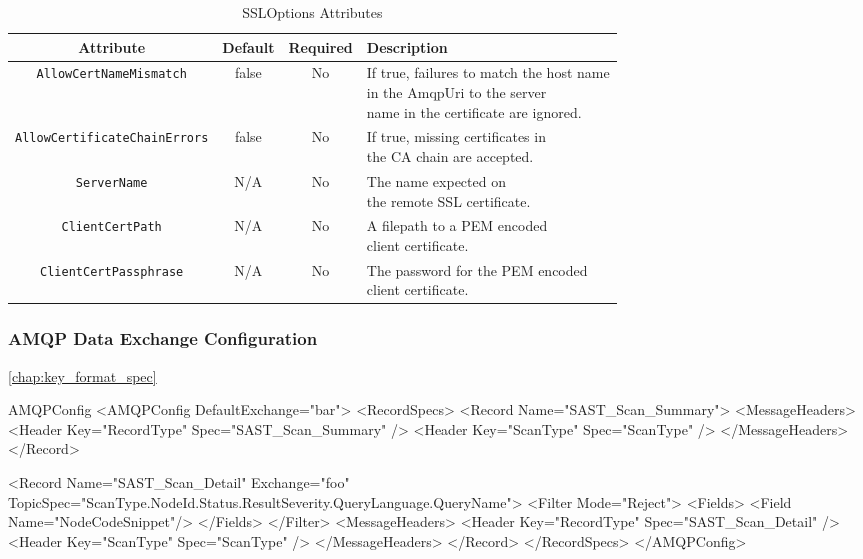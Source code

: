 \begin{table}[h]
    \caption{SSLOptions Attributes}        
    \begin{tabularx}{\textwidth}{cccl}
        \toprule
        \textbf{Attribute} & \textbf{Default} & \textbf{Required} & \textbf{Description}\\
        \midrule
        \texttt{AllowCertNameMismatch} & false & No & \makecell[l]{If true, failures to match the host name\\
        in the AmqpUri to the server\\
        name in the certificate are ignored.}\\
        \midrule
        \texttt{AllowCertificateChainErrors} & false & No & \makecell[l]{If true, missing certificates in\\
        the CA chain are accepted.}\\
        \midrule
        \texttt{ServerName} & N/A & No & \makecell[l]{The name expected on\\
        the remote SSL certificate.}\\
        \midrule
        \texttt{ClientCertPath} & N/A & No & \makecell[l]{A filepath to a PEM encoded\\
        client certificate.}\\
        \midrule
        \texttt{ClientCertPassphrase} & N/A & No & \makecell[l]{The password for the PEM encoded\\
        client certificate.}\\
        \bottomrule
    \end{tabularx}
\end{table}


\subsubsection{AMQP Data Exchange Configuration}

\ref{chap:key_format_spec}

\begin{xml}{AMQPConfig}{\expandsenv}{}
<AMQPConfig DefaultExchange="bar">
    <RecordSpecs>
        <Record Name="SAST_Scan_Summary">
            <MessageHeaders>
                <Header Key="RecordType" Spec="SAST_Scan_Summary" />
                <Header Key="ScanType" Spec="{ScanType}" />
            </MessageHeaders> 
        </Record>

        <Record 
            Name="SAST_Scan_Detail" 
            Exchange="foo" 
            TopicSpec="{ScanType}.{NodeId}.{Status}.{ResultSeverity}.{QueryLanguage}.{QueryName}">
            <Filter Mode="Reject">
                <Fields>
                    <Field Name="NodeCodeSnippet"/>
                </Fields>
            </Filter>
            <MessageHeaders>
                <Header Key="RecordType" Spec="SAST_Scan_Detail" />
                <Header Key="ScanType" Spec="{ScanType}" />
            </MessageHeaders> 
        </Record>
    </RecordSpecs>
</AMQPConfig>
\end{xml}
    
